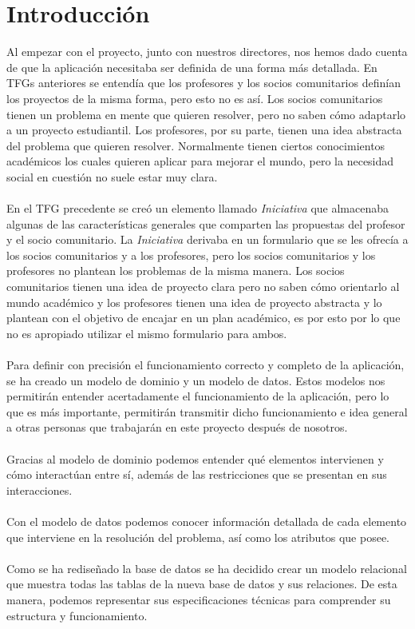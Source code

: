 \documentclass[11pt]{book}
\begin{document}
	\section{Introducción}
	Al empezar con el proyecto, junto con nuestros directores, nos hemos dado cuenta de que la aplicación necesitaba ser definida de una forma más detallada. En TFGs anteriores se entendía que los profesores y los socios comunitarios definían los proyectos de la misma forma, pero esto no es así. Los socios comunitarios tienen un problema en mente que quieren resolver, pero no saben cómo adaptarlo a un proyecto estudiantil. Los profesores, por su parte, tienen una idea abstracta del problema que quieren resolver. Normalmente tienen ciertos conocimientos académicos los cuales quieren aplicar para mejorar el mundo, pero la necesidad social en cuestión no suele estar muy clara.\\\\
	En el TFG precedente se creó un elemento llamado \emph{Iniciativa} que almacenaba algunas de las características generales que comparten las propuestas del profesor y el socio comunitario. La \emph{Iniciativa} derivaba en un formulario que se les ofrecía a los socios comunitarios y a los profesores, pero los socios comunitarios y los profesores no plantean los problemas de la misma manera. Los socios comunitarios tienen una idea de proyecto clara pero no saben cómo orientarlo al mundo académico y los profesores tienen una idea de proyecto abstracta y lo plantean con el objetivo de encajar en un plan académico, es por esto por lo que no es apropiado utilizar el mismo formulario para ambos.\\\\
	Para definir con precisión el funcionamiento correcto y completo de la aplicación, se ha creado un modelo de dominio y un modelo de datos.
	Estos modelos nos permitirán entender acertadamente el funcionamiento de la aplicación, pero lo que es más importante, permitirán transmitir dicho funcionamiento e idea general a otras personas que trabajarán en este proyecto después de nosotros.\\\\
	Gracias al modelo de dominio podemos entender qué elementos intervienen y cómo interactúan entre sí, además de las restricciones que se presentan en sus interacciones.\\\\
	Con el modelo de datos podemos conocer información detallada de cada elemento que interviene en la resolución del problema, así como los atributos que posee.\\\\
	Como se ha rediseñado la base de datos se ha decidido crear un modelo relacional que muestra todas las tablas de la nueva base de datos y sus relaciones. De esta manera, podemos representar sus especificaciones técnicas para comprender su estructura y funcionamiento. 
	
\end{document}
